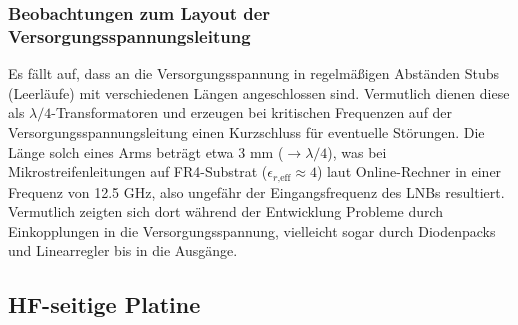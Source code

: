 \documentclass[]{article}
\begin{document}
	\subsubsection{Beobachtungen zum Layout der Versorgungsspannungsleitung}
		
		
		\noindent Es fällt auf, dass an die Versorgungsspannung in regelmäßigen Abständen Stubs (Leerläufe) mit verschiedenen Längen angeschlossen sind. Vermutlich dienen diese als $\lambda/4$-Transformatoren und erzeugen bei kritischen Frequenzen auf der Versorgungsspannungsleitung einen Kurzschluss für eventuelle Störungen. Die Länge solch eines Arms beträgt etwa 3 mm ($\rightarrow\lambda/4$), was bei Mikrostreifenleitungen auf FR4-Substrat ($\epsilon_{r\text{,eff}}\approx4$) laut Online-Rechner in einer Frequenz von 12.5 GHz, also ungefähr der Eingangsfrequenz des LNBs resultiert. Vermutlich zeigten sich dort während der Entwicklung Probleme durch Einkopplungen in die Versorgungsspannung, vielleicht sogar durch Diodenpacks und Linearregler bis in die Ausgänge.
		
	\subsection{HF-seitige Platine}
	
\end{document}
